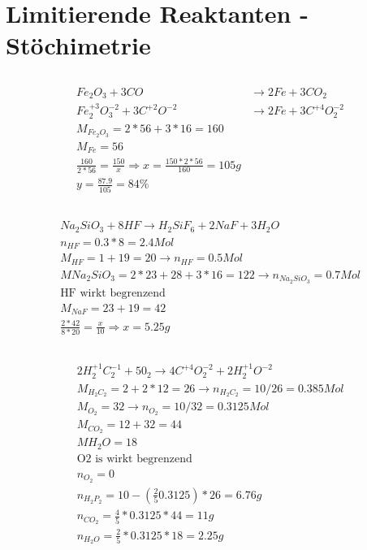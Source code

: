 \documentclass[a4paper]{article}
\begin{document}
\section{Limitierende Reaktanten - Stöchimetrie}
\subsection{}
\begin{align}
  Fe_2O_3 + 3 CO &\rightarrow 2Fe + 3CO_2\\
  Fe_2^{+3}O_3^{-2} + 3 C^{+2}O^{-2} &\rightarrow 2Fe + 3C^{+4}O_2^{-2}\\
  M_{Fe_2O_3}=2*56+3*16=160\\
  M_{Fe}=56\\
  \frac{160}{2*56}=\frac{150}{x} \Rightarrow x=\frac{150 * 2 * 56}{160}=105g\\
  y=\frac{87.9}{105}=84\%
\end{align}

\subsection{}
\begin{align}
  Na_2SiO_3 + 8 HF \rightarrow H_2SiF_6 + 2 NaF +3 H_2O\\
  n_{HF}=0.3*8=2.4 Mol\\
  M_{HF}=1+19=20 \rightarrow n_{HF}=0.5 Mol\\
  M{Na_2SiO_3}=2*23+28+3*16=122 \rightarrow n_{Na_2SiO_3}=0.7 Mol\\
  \text{HF wirkt begrenzend}\\
  M_{NaF}=23+19=42\\
  \frac{2*42}{8*20}=\frac{x}{10} \Rightarrow x=5.25g
\end{align}

\subsection{}
\begin{align}
  2 H_2^{+1}C_2^{-1} + 5 0_2 \rightarrow 4 C^{+4}O_2^{-2} + 2 H_2^{+1}O^{-2}\\
  M_{H_2C_2}=2+2*12=26 \rightarrow n_{H_2C_2}=10/26=0.385 Mol\\
  M_{O_2}=32 \rightarrow n_{O_2}=10/32=0.3125 Mol\\
  M_{CO_2}=12+32=44\\
  M{H_2O}=18\\
  \text{O2 is wirkt begrenzend}\\
  n_{O_2}=0\\
  n_{H_2P_2}=10-(\frac{2}{5}0.3125)*26=6.76g\\
  n_{CO_2}=\frac{4}{5}*0.3125*44=11g\\
  n_{H_2O}=\frac{2}{5}*0.3125*18=2.25g
\end{align}
\end{document}

